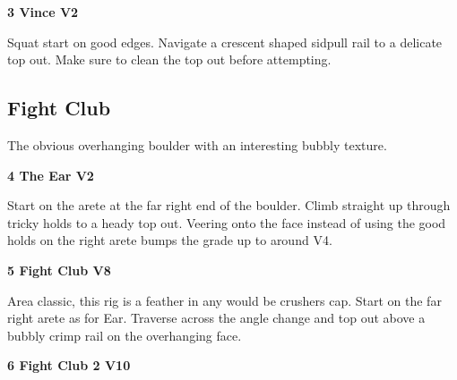 \begin{multicols}{2}
					\begin{minipage}{\linewidth}	
					\label{rt:Vince}
\colorbox{green!20}{
\parbox{0.95\textwidth}{
\textbf{
3 Vince V2    
}
}
}

					\begin{adjustwidth}{0.5cm}{}				
					Squat start on good edges. Navigate a crescent shaped sidpull rail to a delicate top out. Make sure to clean the top out before attempting.
					\end{adjustwidth}
					\end{minipage}
			\begin{minipage}{\columnwidth}
			\subsection*{Fight Club}\label{bf:Fight Club}
			The obvious overhanging boulder with an interesting bubbly texture.
			
\label{pt:Fight Club}
			\end{minipage}
			
					\begin{minipage}{\linewidth}	
					\label{rt:The Ear}
\colorbox{green!20}{
\parbox{0.95\textwidth}{
\textbf{
4 The Ear V2     
}
}
}

					\begin{adjustwidth}{0.5cm}{}				
					Start on the arete at the far right end of the boulder. Climb straight up through tricky holds to a heady top out. Veering onto the face instead of using the good holds on the right arete bumps the grade up to around V4.
					\end{adjustwidth}
					\end{minipage}


					\begin{minipage}{\linewidth}	
					\label{rt:Fight Club}
\colorbox{Goldenrod!50}{
\parbox{0.95\textwidth}{
\textbf{
5 Fight Club V8     
}
}
}

					\begin{adjustwidth}{0.5cm}{}				
					Area classic, this rig is a feather in any would be crushers cap. Start on the far right arete as for Ear. Traverse across the angle change and top out above a bubbly crimp rail on the overhanging face.
					\end{adjustwidth}
					\end{minipage}
					\begin{minipage}{\linewidth}	
					\label{rt:Fight Club 2}
\colorbox{red!20}{
\parbox{0.95\textwidth}{
\textbf{
6 Fight Club 2 V10    
}
}
}


\end{minipage}
\end{multicols}
